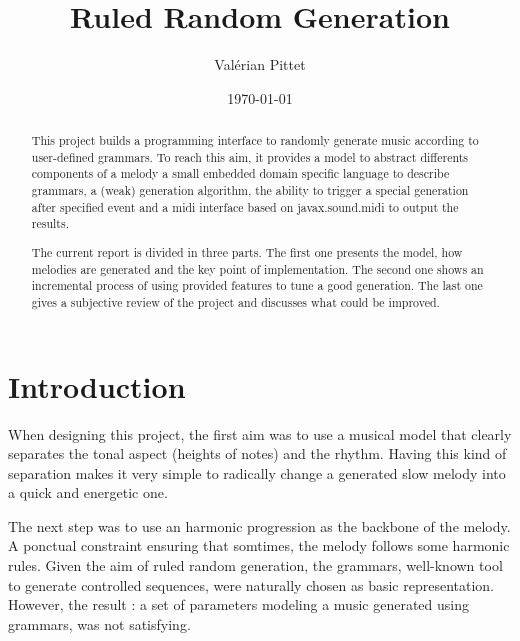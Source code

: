 \documentclass[twocolumn, 11pt]{article}
\begin{document}
\newcommand{\lln}[1]{
  \lstinline@#1@
}

\title{Ruled Random Generation}
\author{Val\'erian Pittet}
\date{\today}

\onecolumn

\maketitle
\begin{abstract}

This project builds a programming interface to randomly generate music according to user-defined grammars.
To reach this aim, it provides
a model to abstract differents components of a melody
a small embedded domain specific language to describe grammars,
a (weak) generation algorithm,
the ability to trigger a special generation after specified event
and a midi interface based on javax.sound.midi to output the results.

The current report is divided in three parts.
The first one presents the model, how melodies are generated and the key point of implementation.
The second one shows an incremental process of using provided features to tune a good generation.
The last one gives a subjective review of the project and discusses what could be improved.


\end{abstract}
\newpage
\tableofcontents
  


\twocolumn

\section{Introduction}    



When designing this project, the first aim was to use a musical model that clearly separates the tonal aspect (heights of notes) and the rhythm.
Having this kind of separation makes it very simple to radically change a generated slow melody into a quick and energetic one.

The next step was to use an harmonic progression as the backbone of the melody. A ponctual constraint ensuring that somtimes, the melody follows some harmonic rules.
Given the aim of ruled random generation, the grammars, well-known tool to generate controlled sequences, were naturally chosen as basic representation.
However, the result : a set of parameters modeling a music generated using grammars, was not satisfying.
\end{document}
